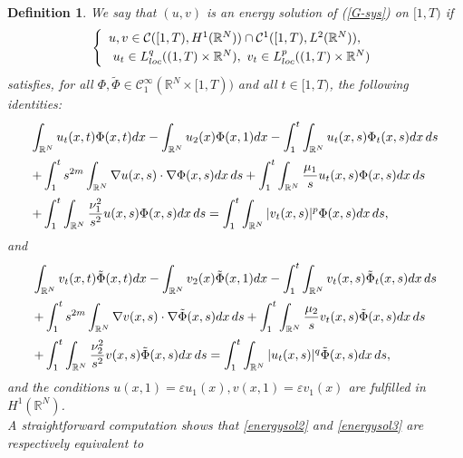 \documentclass[12pt,leqno]{amsart}
\numberwithin{equation}{section}
\newtheorem{Def}[theo]{Definition}
\theoremstyle{remark}
\newcommand{\m}{m}
\newcommand{\M}{m}
\def\R{{\mathbb{R}}}
\def\d{\displaystyle}
\begin{document}
\begin{Def}\label{def1}
 We say that $(u,v)$ is an energy  solution of
 (\ref{G-sys}) on $[1,T)$
if
\begin{displaymath}
\left\{
\begin{array}{l}
u,v\in \mathcal{C}([1,T),H^1(\R^N))\cap \mathcal{C}^1([1,T),L^2(\R^N)), \vspace{.1cm}\\
  \ u_t \in L^q_{loc}((1,T)\times \R^N), \ v_t \in L^p_{loc}((1,T)\times \R^N)
 \end{array}
  \right.
\end{displaymath}
satisfies, for all $\Phi, \tilde{\Phi} \in \mathcal{C}_1^{\infty}(\R^N\times[1,T))$ and all $t\in[1,T)$, the following identities:
\begin{equation}
\label{energysol2}
\begin{array}{l}
\d\int_{\R^N}u_t(x,t)\Phi(x,t)dx-\int_{\R^N}u_2(x)\Phi(x,1)dx  -\int_1^t  \int_{\R^N}u_t(x,s)\Phi_t(x,s)dx \,ds\vspace{.2cm}\\
\d+\int_1^t  s^{2\m}\int_{\R^N}\nabla u(x,s)\cdot\nabla\Phi(x,s) dx \,ds  +\int_1^t  \int_{\R^N}\frac{\mu_1}{s}u_t(x,s) \Phi(x,s)dx \,ds \vspace{.2cm}\\
\d+\int_1^t  \int_{\R^N}\frac{\nu^2_1}{s^2}u(x,s) \Phi(x,s)dx \,ds=\int_1^t \int_{\R^N}|v_t(x,s)|^p\Phi(x,s)dx \,ds,
\end{array}
\end{equation}
and
\begin{equation}
\label{energysol3}
\begin{array}{l}
\d\int_{\R^N}v_t(x,t)\tilde{\Phi}(x,t)dx-\int_{\R^N}v_2(x)\tilde{\Phi}(x,1)dx  -\int_1^t  \int_{\R^N}v_t(x,s)\tilde{\Phi}_t(x,s)dx \,ds \vspace{.2cm}\\
\d +\int_1^t s^{2\M} \int_{\R^N}\nabla v(x,s)\cdot\nabla\tilde{\Phi}(x,s) dx \,ds +\int_1^t  \int_{\R^N}\frac{\mu_2}{s}v_t(x,s) \tilde{\Phi}(x,s)dx \,ds \vspace{.2cm}\\
\d  +\int_1^t  \int_{\R^N}\frac{\nu^2_2}{s^2}v(x,s) \tilde{\Phi}(x,s)dx \,ds=\int_1^t \int_{\R^N}|u_t(x,s)|^q\tilde{\Phi}(x,s)dx \,ds,
\end{array}
\end{equation}
 and the conditions $u(x,1)=\varepsilon u_1(x), v(x,1)=\varepsilon v_1(x)$ are fulfilled in $H^1(\mathbb{R}^N)$.\\
A straightforward computation shows that \eqref{energysol2} and \eqref{energysol3} are respectively equivalent to

\end{Def}
\end{document}
